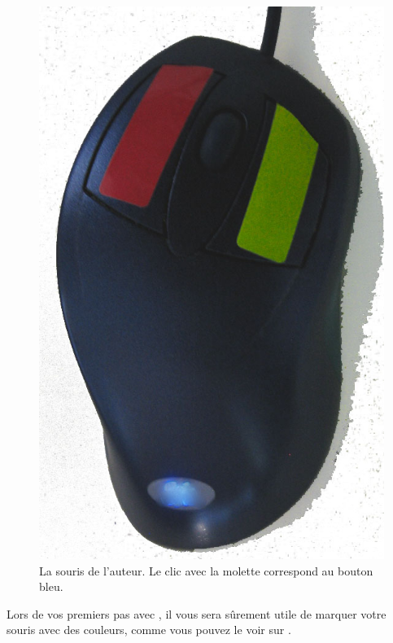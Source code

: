 \documentclass[a4paper,10pt,twoside]{book}
\begin{document}
\begin{figure}
\includegraphics[width=0.95\linewidth]{colouredMouse}
\caption{La souris de l'auteur. Le clic avec la molette correspond au bouton bleu.\label{fig:colouredMouse}}
\end{figure}
 
Lors de vos premiers pas avec \sq, il vous sera sûrement utile de
marquer votre souris avec des couleurs, comme vous pouvez le voir sur .
\end{document}
